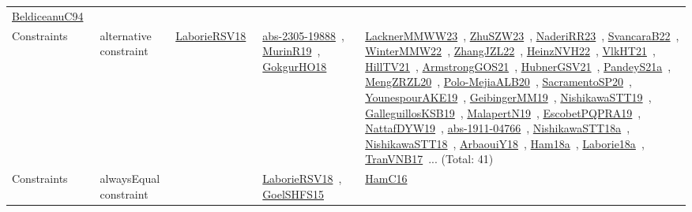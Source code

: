 {\begin{longtable}{lp{3cm}>{\raggedright\arraybackslash}p{6cm}>{\raggedright\arraybackslash}p{6cm}>{\raggedright\arraybackslash}p{8cm}}
\href{../works/BeldiceanuC94.pdf}{BeldiceanuC94}~\cite{BeldiceanuC94}\\
Constraints & alternative constraint & \href{../works/LaborieRSV18.pdf}{LaborieRSV18}~\cite{LaborieRSV18} & \href{../works/abs-2305-19888.pdf}{abs-2305-19888}~\cite{abs-2305-19888}, \href{../works/MurinR19.pdf}{MurinR19}~\cite{MurinR19}, \href{../works/GokgurHO18.pdf}{GokgurHO18}~\cite{GokgurHO18} & \href{../works/LacknerMMWW23.pdf}{LacknerMMWW23}~\cite{LacknerMMWW23}, \href{../works/ZhuSZW23.pdf}{ZhuSZW23}~\cite{ZhuSZW23}, \href{../works/NaderiRR23.pdf}{NaderiRR23}~\cite{NaderiRR23}, \href{../works/SvancaraB22.pdf}{SvancaraB22}~\cite{SvancaraB22}, \href{../works/WinterMMW22.pdf}{WinterMMW22}~\cite{WinterMMW22}, \href{../works/ZhangJZL22.pdf}{ZhangJZL22}~\cite{ZhangJZL22}, \href{../works/HeinzNVH22.pdf}{HeinzNVH22}~\cite{HeinzNVH22}, \href{../works/VlkHT21.pdf}{VlkHT21}~\cite{VlkHT21}, \href{../works/HillTV21.pdf}{HillTV21}~\cite{HillTV21}, \href{../works/ArmstrongGOS21.pdf}{ArmstrongGOS21}~\cite{ArmstrongGOS21}, \href{../works/HubnerGSV21.pdf}{HubnerGSV21}~\cite{HubnerGSV21}, \href{../works/PandeyS21a.pdf}{PandeyS21a}~\cite{PandeyS21a}, \href{../works/MengZRZL20.pdf}{MengZRZL20}~\cite{MengZRZL20}, \href{../works/Polo-MejiaALB20.pdf}{Polo-MejiaALB20}~\cite{Polo-MejiaALB20}, \href{../works/SacramentoSP20.pdf}{SacramentoSP20}~\cite{SacramentoSP20}, \href{../works/YounespourAKE19.pdf}{YounespourAKE19}~\cite{YounespourAKE19}, \href{../works/GeibingerMM19.pdf}{GeibingerMM19}~\cite{GeibingerMM19}, \href{../works/NishikawaSTT19.pdf}{NishikawaSTT19}~\cite{NishikawaSTT19}, \href{../works/GalleguillosKSB19.pdf}{GalleguillosKSB19}~\cite{GalleguillosKSB19}, \href{../works/MalapertN19.pdf}{MalapertN19}~\cite{MalapertN19}, \href{../works/EscobetPQPRA19.pdf}{EscobetPQPRA19}~\cite{EscobetPQPRA19}, \href{../works/NattafDYW19.pdf}{NattafDYW19}~\cite{NattafDYW19}, \href{../works/abs-1911-04766.pdf}{abs-1911-04766}~\cite{abs-1911-04766}, \href{../works/NishikawaSTT18a.pdf}{NishikawaSTT18a}~\cite{NishikawaSTT18a}, \href{../works/NishikawaSTT18.pdf}{NishikawaSTT18}~\cite{NishikawaSTT18}, \href{../works/ArbaouiY18.pdf}{ArbaouiY18}~\cite{ArbaouiY18}, \href{../works/Ham18a.pdf}{Ham18a}~\cite{Ham18a}, \href{../works/Laborie18a.pdf}{Laborie18a}~\cite{Laborie18a}, \href{../works/TranVNB17.pdf}{TranVNB17}~\cite{TranVNB17}... (Total: 41)\\
Constraints & alwaysEqual constraint &  & \href{../works/LaborieRSV18.pdf}{LaborieRSV18}~\cite{LaborieRSV18}, \href{../works/GoelSHFS15.pdf}{GoelSHFS15}~\cite{GoelSHFS15} & \href{../works/HamC16.pdf}{HamC16}~\cite{HamC16}\\

\end{longtable}}
